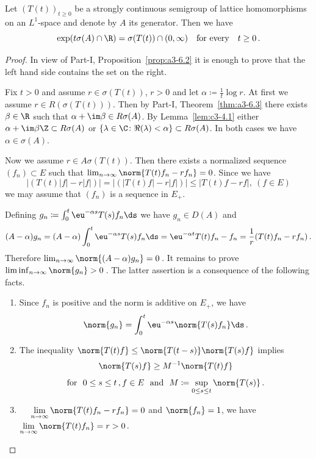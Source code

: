 \begin{proposition}\label{prop:c3-4.5}
Let $(T(t))_{t \geq 0}$ be a strongly continuous semigroup
of lattice homomorphisms on an $L^1$-space and denote by $A$ its generator.
Then we have
\begin{equation}\label{eq:c3-4.7}
	\exp(t\sigma(A) \cap \R ) = \sigma(T(t)) \cap (0,\infty) \quad \text{for every} \quad t \geq 0\,.
\end{equation}
\end{proposition}
\begin{proof}
In view of Part-I, Proposition~\ref{prop:a3-6.2} it is enough to prove that the left hand
side contains the set on the right.

Fix $t > 0$ and assume $r \in \sigma(T(t))$, $r > 0$ and let $\alpha \coloneqq \frac{1}{t} \log r$.
At first we assume $r \in R(\sigma(T(t)))$.
Then by Part-I, Theorem~\ref{thm:a3-6.3} there exists
$\beta \in \R $ such that $\alpha+\im\beta \in R\sigma(A)$.
By Lemma~\ref{lem:c3-4.1} either $\alpha+\im\beta\Z \subset R\sigma(A)$
or $\{\lambda \in \C  \colon \Re(\lambda) < \alpha\} \subset R\sigma(A)$.
In both cases we have $\alpha \in \sigma(A)$.

Now we assume $r \in A\sigma(T(t))$. 
Then there exists a normalized sequence
$(f_n) \subset E$ such that $\lim_{n \to \infty}\norm{T(t)f_n - rf_n} = 0$.
Since we have
\[
|(T(t)|f| - r|f|)| = |(|T(t)f| - r|f|)| \leq |T(t)f - rf|, \  (f \in E) 
\]
we may assume that $(f_n)$ is a sequence in $E_+$.

Defining $g_n \coloneqq \int_{0}^{t} \eu^{-\alpha s}T(s)f_n \ds $ we have $g_n \in D(A)$ and
\[
(A-\alpha)g_n = (A-\alpha)\int_{0}^{t} \eu^{-\alpha s}T(s)f_n \ds = \eu^{-\alpha t}T(t)f_n - f_n = \frac{1}{r}(T(t)f_n - rf_n)\,.
\]
Therefore $\lim_{n \to \infty}\norm{(A - \alpha) g_n} = 0$\,. It remains to prove 
$\liminf_{n \to \infty}\norm{g_n} > 0$\,.
The latter assertion is a consequence of the following facts.
\begin{enumerate}[\upshape (i),wide, labelindent=.25em]
	\item
	Since $f_n$ is positive and the norm is additive on $E_+$,
	we have
	\[
    \norm{g_n} = \int_{0}^{t} \eu^{-\alpha s}\norm{T(s)f_n} \ds\,.
    \]
	
	\item 
    The inequality \quad
    $\displaystyle
    \norm{T(t)f} \leq \norm{T(t-s)}\norm{T(s)f}
    $\quad 
    implies
	\[
    \norm{T(s)f} \geq M^{-1}\norm{T(t)f}
    \]
    \[
    \text{for } \ 0 \leq s \leq t\,, f \in E \ \text{ and } \ M \coloneqq \sup_{0 \leq s \leq t}\norm{T(s) }\,.
    \]
    
	 \item 
	 \  \  
     $\displaystyle\lim_{n \to \infty}\norm{T(t)f_n - rf_n} = 0$ 
     and $\norm{f_n} = 1$, we have
    $\displaystyle
     \lim_{n \to \infty}\norm{T(t)f_n} = r > 0\,.
    $
\end{enumerate}
\end{proof}
